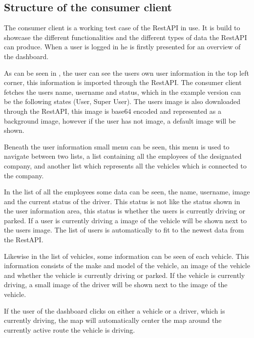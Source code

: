 \subsection{Structure of the consumer client}\label{ssec:consumer_client_structure}
The consumer client is a working test case of the RestAPI in use.
It is build to showcase the different functionalities and the different types of data the RestAPI can produce.
When a user is logged in he is firstly presented for an overview of the dashboard.


As can be seen in , the user can see the users own user information in the top left corner, this information is imported through the RestAPI.
The consumer client fetches the users name, username and status, which in the example version can be the following states (User, Super User).
The users image is also downloaded through the RestAPI, this image is base64 encoded and represented as a background image, however if the user has not image, a default image will be shown.

\bigskip
Beneath the user information small menu can be seen, this menu is used to navigate between two lists, a list containing all the employees of the designated company, and another list which represents all the vehicles which is connected to the company.


In the list of all the employees some data can be seen, the name, username, image and the current status of the driver.
This status is not like the status shown in the user information area, this status is whether the users is currently driving or parked.
If a user is currently driving a image of the vehicle will be shown next to the users image.
The list of users is automatically to fit to the newest data from the RestAPI.

Likewise in the list of vehicles, some information can be seen of each vehicle.
This information consists of the make and model of the vehicle, an image of the vehicle and whether the vehicle is currently driving or parked.
If the vehicle is currently driving, a small image of the driver will be shown next to the image of the vehicle.

If the user of the dashboard clicks on either a vehicle or a driver, which is currently driving, the map will automatically center the map around the currently active route the vehicle is driving.

